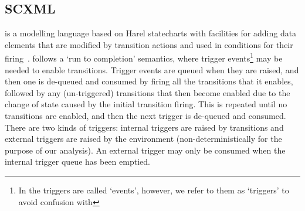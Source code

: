 
\subsection{SCXML}
\label{sec:scxml}

\SCXML is a modelling language based on Harel statecharts with facilities for adding data elements that are modified by transition actions and used in conditions for their firing~\cite{scxmlwebsite}. \SCXML follows a `run to completion' semantics, where trigger events\footnote{In \SCXML the triggers are called `events', however, we refer to them as `triggers' to avoid confusion with \EventB} may be needed to enable transitions. Trigger events are queued when they are raised, and then one is de-queued and consumed by firing all the transitions that it enables, followed by any (un-triggered) transitions that then become enabled due to the change of state caused by the initial transition firing. This is repeated until no transitions are enabled, and then the next trigger is de-queued and consumed. There are two kinds of triggers: internal triggers are raised by transitions and external triggers are raised by the environment (non-deterministically for the purpose of our analysis). An external trigger may only be consumed when the internal trigger queue has been emptied. 



